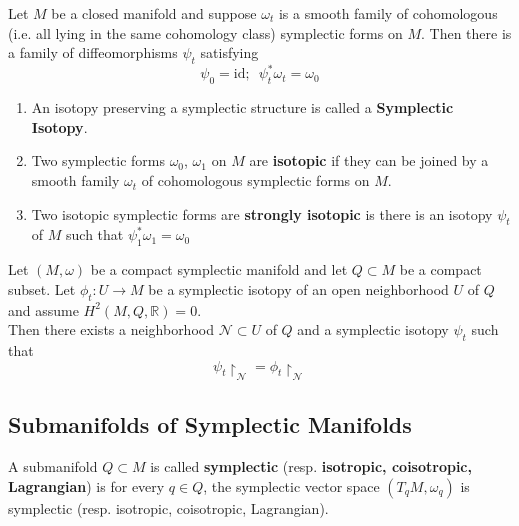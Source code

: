 \begin{thm}
Let $M$ be a closed manifold and suppose $\omega_t$ is a smooth family of cohomologous (i.e. all lying in the same cohomology class) symplectic forms on $M$. Then there is a family of diffeomorphisms $\psi_t$ satisfying
\begin{equation}
    \psi_0 = \mathrm{id}; \hspace{6pt} \psi_t^*\omega_t = \omega_0
\end{equation}
\end{thm}

\begin{defn}
\begin{enumerate}
    \item An isotopy preserving a symplectic structure is called a \textbf{Symplectic Isotopy}.
    \item Two symplectic forms $\omega_0$, $\omega_1$ on $M$ are \textbf{isotopic} if they can be joined by a smooth family $\omega_t$ of cohomologous symplectic forms on $M$.
    \item Two isotopic symplectic forms are \textbf{strongly isotopic} is there is an isotopy $\psi_t$ of $M$ such that $\psi_1^* \omega_1 =\omega_0$
\end{enumerate}
\end{defn}

\begin{thm}
Let $(M,\omega)$ be a compact symplectic manifold and let $Q \subset M$ be a compact subset. Let $\phi_t: U \to M$ be a symplectic isotopy of an open neighborhood $U$ of $Q$ and assume $H^2(M,Q,\mathbb{R})=0$. \\
\indent Then there exists a neighborhood $\mathcal{N} \subset U$ of $Q$ and a symplectic isotopy $\psi_t$ such that
\begin{equation}
    \psi_t \restriction_{\mathcal{N}} = \phi_t \restriction_{\mathcal{N}}
\end{equation}
\end{thm}

\subsection{Submanifolds of Symplectic Manifolds}

\begin{defn}
A submanifold $Q \subset M$ is called \textbf{symplectic} (resp. \textbf{isotropic, coisotropic, Lagrangian}) is for every $q \in Q$, the symplectic vector space $(T_qM, \omega_q)$ is symplectic (resp. isotropic, coisotropic, Lagrangian).
\end{defn}


